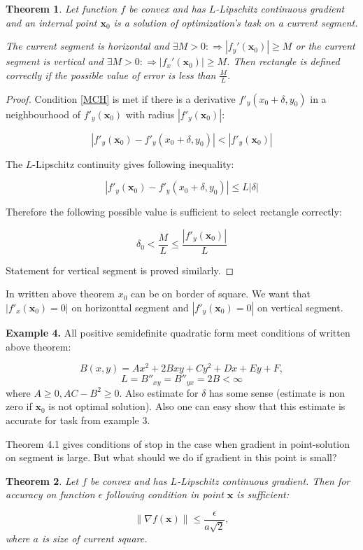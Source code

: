 \documentclass[12pt]{article}
\newtheorem{theorem}{Theorem}[section]
\begin{document}
\begin{theorem}
Let function $f$ be convex and has $L$-Lipschitz continuous gradient and an internal point $\textbf{x}_0$ is a solution of optimization's  task on a current segment. 

The current segment is horizontal and $\exists M>0  : \Rightarrow|f_y'(\textbf{x}_0)| \geq M$ or the current segment is vertical and $\exists M>0  : \Rightarrow|f_x'(\textbf{x}_0)| \geq M$. Then rectangle is defined correctly if the possible value of error is less than $\frac{M}{L}$.
\end{theorem}
\begin{proof}
Condition \eqref{MCH} is met if there is a derivative $f'_y(x_0+\delta, y_0)$ in a neighbourhood of 
$f'_y(\textbf{x}_0)$ with radius $\left|f'_y(\textbf{x}_0)\right|$:

$$\left|f'_y(\textbf{x}_0) - f'_y(x_0+\delta, y_0)\right|<\left|f'_y(\textbf{x}_0)\right|$$

The $L$-Lipschitz continuity gives following inequality:

$$\left|f'_y(\textbf{x}_0) - f'_y(x_0+\delta, y_0)\right| \leq L|\delta|$$

Therefore the following possible value is sufficient to select rectangle correctly:

$$\delta_0 < \frac{M}{L} \leq \frac{\left|f'_y(\textbf{x}_0)\right|}{L}$$

Statement for vertical segment is proved similarly.
\end{proof}

In written above theorem $x_0$ can be on border of square. We want that $|f'_x(\textbf{x}_0)=0|$ on horizonttal segment and $|f'_y(\textbf{x}_0)=0|$ on vertical segment.

\textbf{Example 4.} All positive semidefinite quadratic form meet conditions of written above theorem:

$$B(x,y) = Ax^2 + 2Bxy + Cy^2 + Dx +Ey + F,$$
$$L = B''_{xy} = B''_{yx} = 2B < \infty$$
where $A \geq 0,AC - B^2\geq0$. Also estimate for $\delta$ has some sense (estimate is non zero if $\textbf{x}_0$ is not optimal solution). Also one can easy show that this estimate is accurate for task from example 3.

Theorem 4.1 gives conditions of stop in the case when gradient in point-solution on segment is large. But what should we do if gradient in this point is small?

\begin{theorem}
Let $f$ be convex and has $L$-Lipschitz continuous gradient. Then for accuracy on function $\epsilon$ following condition in point $\textbf{x}$ is sufficient:

$$\|\nabla f(\textbf{x})\|\leq \frac{\epsilon}{a\sqrt{2}}, $$
where $a$ is size of current square.
\end{theorem}
\end{document}
